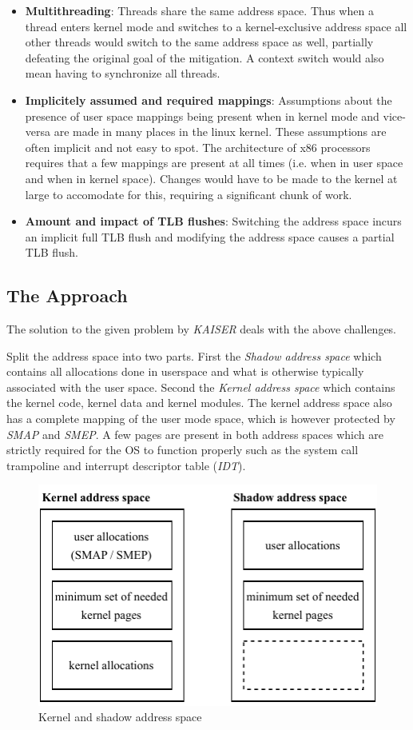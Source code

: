 \begin{itemize}
  \item{
    \textbf{Multithreading}:
    Threads share the same address space.
    Thus when a thread enters kernel mode and switches to a kernel-exclusive address space all other threads would switch to the same address space as well, partially defeating the original goal of the mitigation.
    A context switch would also mean having to synchronize all threads.
  }
  \item{
    \textbf{Implicitely assumed and required mappings}:
    Assumptions about the presence of user space mappings being present when in kernel mode and vice-versa are made in many places in the linux kernel.
    These assumptions are often implicit and not easy to spot.
    The architecture of x86 processors requires that a few mappings are present at all times (i.e. when in user space and when in kernel space).
    Changes would have to be made to the kernel at large to accomodate for this, requiring a significant chunk of work.
  }
  \item{
    \textbf{Amount and impact of TLB flushes}:
    Switching the address space incurs an implicit full TLB flush and modifying the address space causes a partial TLB flush. \cite{the-ginormous-intel-manual-volume-3}
  }
\end{itemize}

\subsection{The Approach}

The solution to the given problem by \textit{KAISER} deals with the above challenges.

Split the address space into two parts. First the \textit{Shadow address space} which contains all allocations done in userspace and what is otherwise typically associated with the user space.
Second the \textit{Kernel address space} which contains the kernel code, kernel data and kernel modules.
The kernel address space also has a complete mapping of the user mode space, which is however protected by \textit{SMAP} and \textit{SMEP}.
A few pages are present in both address spaces which are strictly required for the OS to function properly such as the system call trampoline and interrupt descriptor table (\textit{IDT}).

\begin{figure}[h]
  \begin{center}
    \includegraphics[page=1,width=.4\textwidth]{fig/prebuilt_shadow_address_space}
  \end{center}
  \caption{Kernel and shadow address space}
  \label{fig:shadow_address_space}
\end{figure}

